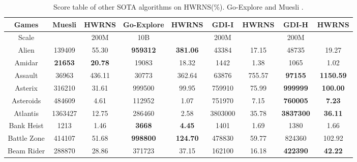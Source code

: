 \documentclass[nohyperref]{article}
\theoremstyle{plain}
\begin{document}
\begin{table}[!hb] 
\footnotesize
\begin{center}
\caption{Score table of other SOTA  algorithms on HWRNS(\%). Go-Explore \citep{goexplore} and Muesli \citep{muesli}.}
\label{Tab: Score table of other SOTA  algorithms on HWRNS.}
\setlength{\tabcolsep}{1.0pt}
\begin{tabular}{| c | c c |c c |c c |c c |}
\hline
 Games      & Muesli              & HWRNS        & Go-Explore              & HWRNS                   & GDI-I & HWRNS & GDI-H & HWRNS\\
\hline
Scale       &                     & 200M        & 10B                     &                             & 200M      &    &    200M   &\\
\hline    
 Alien        &139409          &55.30               &\textbf{959312}       &\textbf{381.06}                & 43384             &17.15     &48735             &19.27            \\
 Amidar       &\textbf{21653}  &\textbf{20.78}      &19083        &18.32                & 1442              &1.38                         &1065              &1.02          \\
 Assault      &36963           &436.11           &30773                 &362.64                         & 63876      &755.57&\textbf{97155}    &\textbf{1150.59}           \\
 Asterix      &316210          &31.61            &999500       &99.95                 & 759910            &75.99        &\textbf{999999}            &\textbf{100.00}    \\
 Asteroids    &484609          &4.61             &112952                &1.07                           & 751970     &7.15  &\textbf{760005}            &\textbf{7.23}        \\
 Atlantis     &1363427         &12.75            &286460                &2.58                           & 3803000    &35.78 &\textbf{3837300}           &\textbf{36.11}         \\
 Bank Heist   &1213            &1.46          &\textbf{3668}         &\textbf{4.45  }                & 1401              &1.69            &1380              &1.66    \\
 Battle Zone  &414107          &51.68            &\textbf{998800}       &\textbf{124.70}                & 478830            &59.77        &824360            &102.92     \\
 Beam Rider   &288870          &28.86         &371723       &37.15                & 162100            &16.18           &\textbf{422390}            &\textbf{42.22}     \\

\end{tabular}
\end{center}
\end{table}
\end{document}

